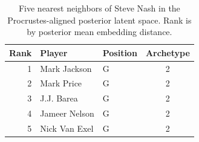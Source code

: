 \begin{table}[htbp]
  \centering\small
  \begin{tabular}{rllc}
    \toprule
    Rank & Player & Position & Archetype \\
    \midrule
    1 & Mark Jackson & G & 2 \\
    2 & Mark Price & G & 2 \\
    3 & J.J. Barea & G & 2 \\
    4 & Jameer Nelson & G & 2 \\
    5 & Nick Van Exel & G & 2 \\
    \bottomrule
  \end{tabular}
  \caption{Five nearest neighbors of Steve Nash in the Procrustes-aligned posterior latent space. Rank is by posterior mean embedding distance.}
  \label{tab:Steve_Nash_neighbors}
\end{table}

